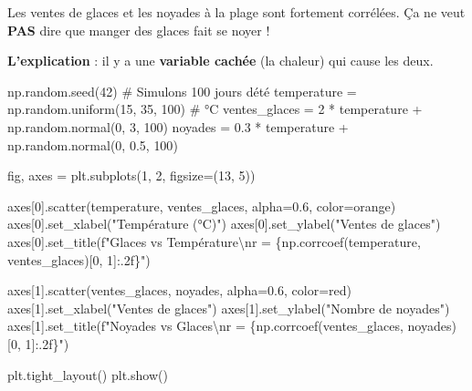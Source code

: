 \documentclass[
  french,
  11pt,
  a4paper,
]{scrbook}
\newenvironment{Shaded}{}{}
\newcommand{\CharTok}[1]{\textcolor[rgb]{0.01,0.18,0.38}{#1}}
\newcommand{\CommentTok}[1]{\textcolor[rgb]{0.42,0.45,0.49}{#1}}
\newcommand{\DecValTok}[1]{\textcolor[rgb]{0.00,0.36,0.77}{#1}}
\newcommand{\FloatTok}[1]{\textcolor[rgb]{0.00,0.36,0.77}{#1}}
\newcommand{\NormalTok}[1]{\textcolor[rgb]{0.14,0.16,0.18}{#1}}
\newcommand{\OperatorTok}[1]{\textcolor[rgb]{0.14,0.16,0.18}{#1}}
\newcommand{\SpecialCharTok}[1]{\textcolor[rgb]{0.00,0.36,0.77}{#1}}
\newcommand{\SpecialStringTok}[1]{\textcolor[rgb]{0.01,0.18,0.38}{#1}}
\newcommand{\StringTok}[1]{\textcolor[rgb]{0.01,0.18,0.38}{#1}}
\begin{document}
Les ventes de glaces et les noyades à la plage sont fortement corrélées.
Ça ne veut \textbf{PAS} dire que manger des glaces fait se noyer !

\textbf{L'explication} : il y a une \textbf{variable cachée} (la
chaleur) qui cause les deux.

\begin{Shaded}
\begin{Highlighting}[]
\NormalTok{np.random.seed(}\DecValTok{42}\NormalTok{)}
\CommentTok{\# Simulons 100 jours d\textquotesingle{}été}
\NormalTok{temperature }\OperatorTok{=}\NormalTok{ np.random.uniform(}\DecValTok{15}\NormalTok{, }\DecValTok{35}\NormalTok{, }\DecValTok{100}\NormalTok{)  }\CommentTok{\# °C}
\NormalTok{ventes\_glaces }\OperatorTok{=} \DecValTok{2} \OperatorTok{*}\NormalTok{ temperature }\OperatorTok{+}\NormalTok{ np.random.normal(}\DecValTok{0}\NormalTok{, }\DecValTok{3}\NormalTok{, }\DecValTok{100}\NormalTok{)}
\NormalTok{noyades }\OperatorTok{=} \FloatTok{0.3} \OperatorTok{*}\NormalTok{ temperature }\OperatorTok{+}\NormalTok{ np.random.normal(}\DecValTok{0}\NormalTok{, }\FloatTok{0.5}\NormalTok{, }\DecValTok{100}\NormalTok{)}

\NormalTok{fig, axes }\OperatorTok{=}\NormalTok{ plt.subplots(}\DecValTok{1}\NormalTok{, }\DecValTok{2}\NormalTok{, figsize}\OperatorTok{=}\NormalTok{(}\DecValTok{13}\NormalTok{, }\DecValTok{5}\NormalTok{))}

\NormalTok{axes[}\DecValTok{0}\NormalTok{].scatter(temperature, ventes\_glaces, alpha}\OperatorTok{=}\FloatTok{0.6}\NormalTok{, color}\OperatorTok{=}\StringTok{\textquotesingle{}orange\textquotesingle{}}\NormalTok{)}
\NormalTok{axes[}\DecValTok{0}\NormalTok{].set\_xlabel(}\StringTok{"Température (°C)"}\NormalTok{)}
\NormalTok{axes[}\DecValTok{0}\NormalTok{].set\_ylabel(}\StringTok{"Ventes de glaces"}\NormalTok{)}
\NormalTok{axes[}\DecValTok{0}\NormalTok{].set\_title(}\SpecialStringTok{f"Glaces vs Température}\CharTok{\textbackslash{}n}\SpecialStringTok{r = }\SpecialCharTok{\{}\NormalTok{np}\SpecialCharTok{.}\NormalTok{corrcoef(temperature, ventes\_glaces)[}\DecValTok{0}\NormalTok{, }\DecValTok{1}\NormalTok{]}\SpecialCharTok{:.2f\}}\SpecialStringTok{"}\NormalTok{)}

\NormalTok{axes[}\DecValTok{1}\NormalTok{].scatter(ventes\_glaces, noyades, alpha}\OperatorTok{=}\FloatTok{0.6}\NormalTok{, color}\OperatorTok{=}\StringTok{\textquotesingle{}red\textquotesingle{}}\NormalTok{)}
\NormalTok{axes[}\DecValTok{1}\NormalTok{].set\_xlabel(}\StringTok{"Ventes de glaces"}\NormalTok{)}
\NormalTok{axes[}\DecValTok{1}\NormalTok{].set\_ylabel(}\StringTok{"Nombre de noyades"}\NormalTok{)}
\NormalTok{axes[}\DecValTok{1}\NormalTok{].set\_title(}\SpecialStringTok{f"Noyades vs Glaces}\CharTok{\textbackslash{}n}\SpecialStringTok{r = }\SpecialCharTok{\{}\NormalTok{np}\SpecialCharTok{.}\NormalTok{corrcoef(ventes\_glaces, noyades)[}\DecValTok{0}\NormalTok{, }\DecValTok{1}\NormalTok{]}\SpecialCharTok{:.2f\}}\SpecialStringTok{"}\NormalTok{)}

\NormalTok{plt.tight\_layout()}
\NormalTok{plt.show()}
\end{Highlighting}
\end{Shaded}
\end{document}
